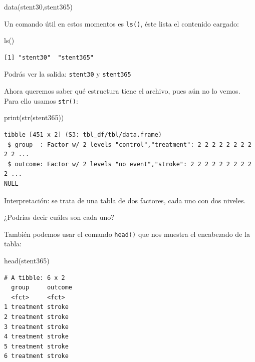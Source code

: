 \documentclass[
  spanish,
  letterpaper,
  DIV=11,
  numbers=noendperiod]{scrartcl}
\newenvironment{Shaded}{\begin{snugshade}}{\end{snugshade}}
\newcommand{\FunctionTok}[1]{\textcolor[rgb]{0.28,0.35,0.67}{#1}}
\newcommand{\NormalTok}[1]{\textcolor[rgb]{0.00,0.23,0.31}{#1}}
\begin{document}
\begin{Shaded}
\begin{Highlighting}[]
\FunctionTok{data}\NormalTok{(stent30,stent365)}
\end{Highlighting}
\end{Shaded}

Un comando útil en estos momentos es \texttt{ls()}, éste lista el
contenido cargado:

\begin{Shaded}
\begin{Highlighting}[]
\FunctionTok{ls}\NormalTok{()}
\end{Highlighting}
\end{Shaded}

\begin{verbatim}
[1] "stent30"  "stent365"
\end{verbatim}

Podrás ver la salida:
\texttt{\textquotesingle{}stent30\textquotesingle{}} y
\texttt{\textquotesingle{}stent365\textquotesingle{}}

Ahora queremos saber qué estructura tiene el archivo, pues aún no lo
vemos. Para ello usamos \texttt{str()}:

\begin{Shaded}
\begin{Highlighting}[]
\FunctionTok{print}\NormalTok{(}\FunctionTok{str}\NormalTok{(stent365))}
\end{Highlighting}
\end{Shaded}

\begin{verbatim}
tibble [451 x 2] (S3: tbl_df/tbl/data.frame)
 $ group  : Factor w/ 2 levels "control","treatment": 2 2 2 2 2 2 2 2 2 2 ...
 $ outcome: Factor w/ 2 levels "no event","stroke": 2 2 2 2 2 2 2 2 2 2 ...
NULL
\end{verbatim}

Interpretación: se trata de una tabla de dos factores, cada uno con dos
niveles.

¿Podrías decir cuáles son cada uno?

También podemos usar el comando \texttt{head()} que nos muestra el
encabezado de la tabla:

\begin{Shaded}
\begin{Highlighting}[]
\FunctionTok{head}\NormalTok{(stent365)}
\end{Highlighting}
\end{Shaded}

\begin{verbatim}
# A tibble: 6 x 2
  group     outcome
  <fct>     <fct>  
1 treatment stroke 
2 treatment stroke 
3 treatment stroke 
4 treatment stroke 
5 treatment stroke 
6 treatment stroke 
\end{verbatim}
\end{document}
